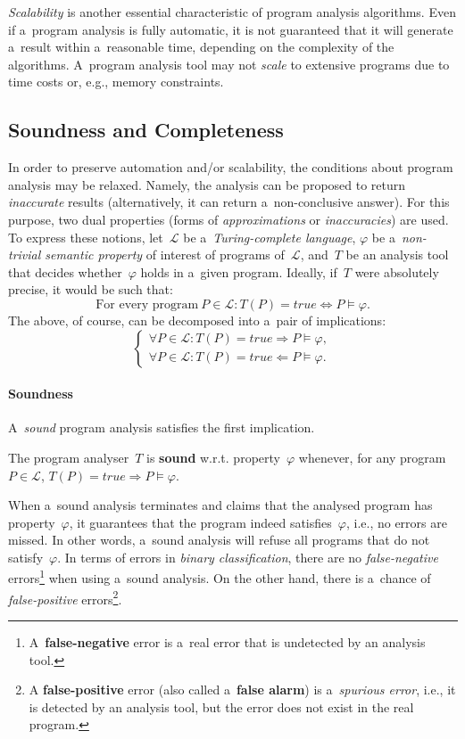 \emph{Scalability} is another essential characteristic of program analysis algorithms. Even if a~program analysis is fully automatic, it is not guaranteed that it will generate a~result within a~reasonable time, depending on the complexity of the algorithms. A~program analysis tool may not \emph{scale} to extensive programs due to time costs or, e.g., memory constraints.

\subsection{Soundness and Completeness}

In order to preserve automation and/or scalability, the conditions about program analysis may be relaxed. Namely, the analysis can be proposed to return \emph{inaccurate} results (alternatively, it can return a~non-conclusive  answer). For this purpose, two dual properties (forms of \emph{approximations} or \emph{inaccuracies}) are used. To express these notions, let~$ \mathcal{L} $ be a~\emph{Turing-complete language}, $ \varphi $ be a~\emph{non-trivial semantic property} of interest of programs of~$ \mathcal{L} $, and~$ T $ be an analysis tool that decides whether~$ \varphi $ holds in a~given program. Ideally, if~$ T $ were absolutely precise, it would be such that:
$$
    \text{For every program}\ P \in \mathcal{L}: T(P) = true \Longleftrightarrow P \models \varphi.
$$
The above, of course, can be decomposed into a~pair of implications:
$$
\begin{cases}
    \forall P \in \mathcal{L}: T(P) = true \Longrightarrow P \models \varphi, \\
    \forall P \in \mathcal{L}: T(P) = true \Longleftarrow P \models \varphi.
\end{cases}
$$

\paragraph{Soundness}
A~\emph{sound} program analysis satisfies the first implication.
\begin{definition}
    The program analyser~$ T $ is \textbf{sound} w.r.t. property~$ \varphi $ whenever, for any program $ P \in \mathcal{L} $, $ T(P) = true \Longrightarrow P \models \varphi $.
\end{definition}
When a~sound analysis terminates and claims that the analysed program has property~$ \varphi $, it guarantees that the program indeed satisfies~$ \varphi $, i.e., no errors are missed. In other words, a~sound analysis will refuse all programs that do not satisfy~$ \varphi $. In terms of errors in \emph{binary classification}, there are no \emph{false-negative} errors\footnote{A~\textbf{false-negative} error is a~real error that is undetected by an analysis tool.} when using a~sound analysis. On the other hand, there is a~chance of \emph{false-positive} errors\footnote{A \textbf{false-positive} error (also called a~\textbf{false alarm}) is a~\emph{spurious error}, i.e., it is detected by an analysis tool, but the error does not exist in the real program.}.

